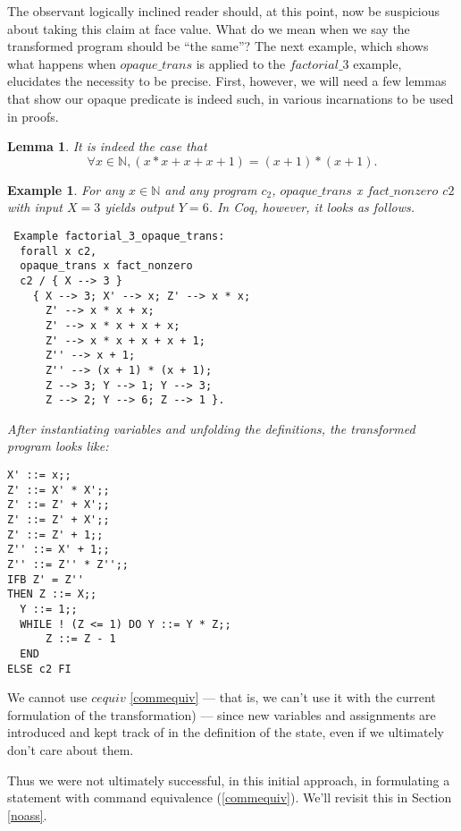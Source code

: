 \documentclass[compsoc,conference,a4paper,10pt,times]{IEEEtran}
\newtheorem{lemma}[theorem]{Lemma}
\newtheorem{example}[theorem]{Example}
\begin{document}
\par The observant logically inclined reader should, at this point, now be suspicious about taking this claim at face value.  What do we mean when we say the transformed program should be ``the same''?  The next example, which shows what happens when $opaque\_trans$ is applied to the $factorial\_3$ example, elucidates the necessity to be precise.  First, however, we will need a few lemmas that show our opaque predicate is indeed such, in various incarnations to be used in proofs.

\begin{lemma}\label{opaqueness}
    It is indeed the case that 
    \[ \forall x \in \mathbb{N}, 
	(x * x + x + x + 1) = (x + 1) * (x + 1).  \] 
\end{lemma}

\begin{example}\label{firstfact}
    For any $x\in \mathbb{N}$ and any program $c_2$, $opaque\_trans$ x $fact\_nonzero$ $c2$ with input $X=3$ yields output $Y=6$.  In Coq, however, it looks as follows.
    \begin{verbatim} Example factorial_3_opaque_trans:
  forall x c2, 
  opaque_trans x fact_nonzero 
  c2 / { X --> 3 } 
    { X --> 3; X' --> x; Z' --> x * x; 
      Z' --> x * x + x; 
      Z' --> x * x + x + x;
      Z' --> x * x + x + x + 1; 
      Z'' --> x + 1; 
      Z'' --> (x + 1) * (x + 1); 
      Z --> 3; Y --> 1; Y --> 3; 
      Z --> 2; Y --> 6; Z --> 1 }.
    \end{verbatim}
      After instantiating variables and unfolding the definitions, the transformed program looks like:
      \begin{verbatim}
X' ::= x;;
Z' ::= X' * X';;
Z' ::= Z' + X';;
Z' ::= Z' + X';;
Z' ::= Z' + 1;;
Z'' ::= X' + 1;;
Z'' ::= Z'' * Z'';;
IFB Z' = Z''
THEN Z ::= X;;
  Y ::= 1;;
  WHILE ! (Z <= 1) DO Y ::= Y * Z;; 
      Z ::= Z - 1 
  END
ELSE c2 FI
      \end{verbatim}
\end{example}
      
\par We cannot use $cequiv$ \eqref{commequiv} --- that is, we can't use it with the current formulation of the transformation) --- since new variables and assignments are introduced and kept track of in the definition of the state, even if we ultimately don't care about them.  
\par Thus we were not ultimately successful, in this initial approach, in formulating a statement with command equivalence (\ref{commequiv}).  We'll revisit this in Section \ref{noass}.
\end{document}
